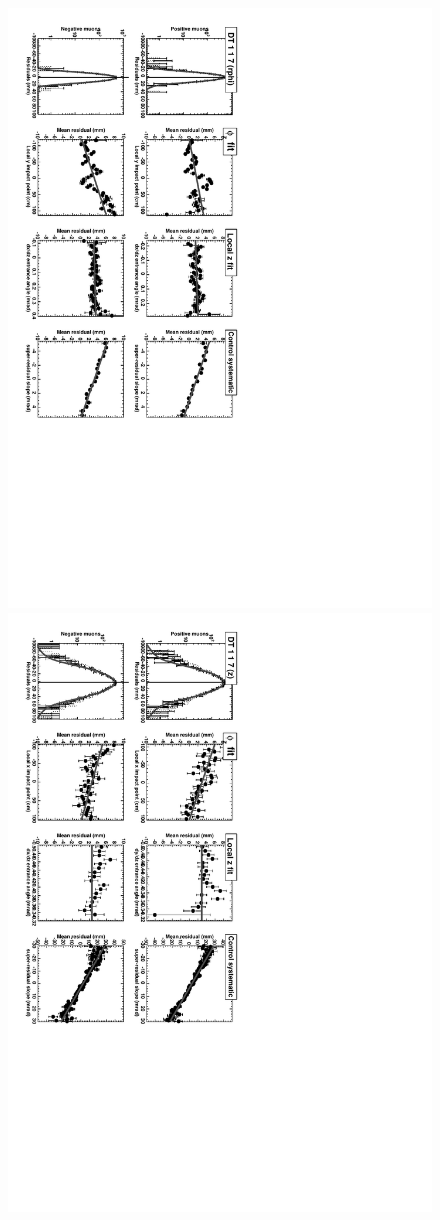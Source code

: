 \documentclass[12pt]{article}
\begin{document}
\begin{figure}
\hspace{0.5 cm} \includegraphics[height=0.8\linewidth, angle=90]{exampleDT_rphi.pdf}

\hfill \includegraphics[height=0.8\linewidth, angle=90]{exampleDT_z.pdf} \hspace{0.5 cm}


\end{figure}
\end{document}

